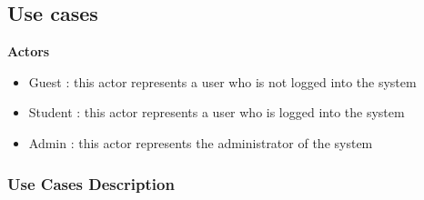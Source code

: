 \documentclass[a4paper]{article}
\begin{document}
\clearpage

\subsection{Use cases}

\textbf{Actors}
\begin{itemize}
\item{Guest : this actor represents a user who is not logged into the system}
\item{Student : this actor represents a user who is logged into the system}
\item{Admin : this actor represents the administrator of the system}
\end{itemize}

\subsubsection{Use Cases Description}
\end{document}
